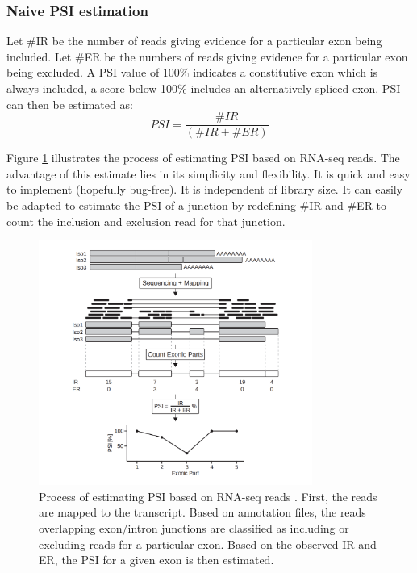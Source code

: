 \subsubsection{Naive PSI estimation}\label{subsubsec:naivepsi}

Let \#IR be the number of reads giving evidence for a particular exon being included. Let \#ER be the numbers of reads giving evidence for a particular exon being excluded. A PSI value of 100\% indicates a constitutive exon which is always included, a score below 100\% includes an alternatively spliced exon. PSI can then be estimated as:
$$PSI = \frac{\#IR}{(\#IR+\#ER)}$$

Figure \ref{fig:psiestimation} illustrates the process of estimating PSI based on RNA-seq reads.  
The advantage of this estimate lies in its simplicity and flexibility. It is quick and easy to implement (hopefully bug-free). It is independent of library size. It can easily be adapted to estimate the PSI of a junction by redefining \#IR and \#ER to count the inclusion and exclusion read for that junction.

\begin{figure}[h]
	\centering\includegraphics[width=0.8\textwidth]{../visualizations/ch4-methods/psi_estimation.png} 
	\caption{
		Process of estimating PSI based on RNA-seq reads \cite{berlinpsi}. First, the reads are mapped to the transcript. Based on annotation files, the reads overlapping exon/intron junctions are classified as including or excluding reads for a particular exon. Based on the observed IR and ER, the PSI for a given exon is then estimated.
	}
	\label{fig:psiestimation}
\end{figure}

